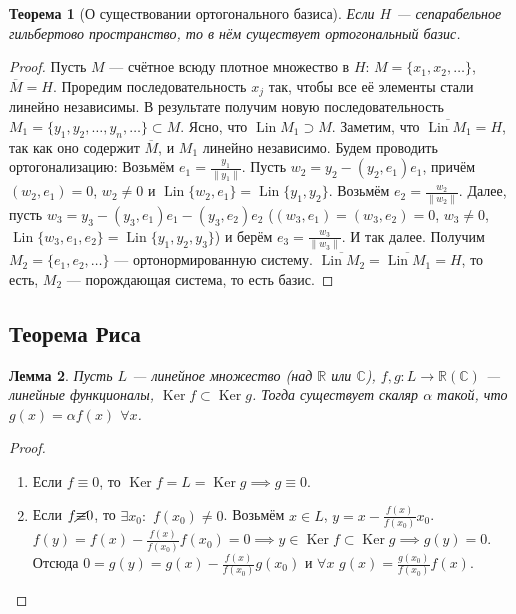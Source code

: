 \documentclass[11pt,openany,a4paper]{scrartcl}
\theoremstyle{plain}
\newtheorem{theorem}{Теорема}[subsection]
\newtheorem{lemma}[theorem]{Лемма}
\theoremstyle{definition}
\newcommand\mb{\mathbb}
\newcommand\real{\mb R}
\newcommand{\complex}{\mb C}
\newcommand\ol{\overline}
\DeclareMathOperator{\Ker}{Ker}
\DeclareMathOperator{\Lin}{Lin}
\begin{document}
\begin{theorem}[О существовании ортогонального базиса]
    Если $H$ — сепарабельное гильбертово пространство, то в нём существует
    ортогональный базис.
\end{theorem}
\begin{proof}
    Пусть $M$ — счётное всюду плотное множество в $H$:
    $M = \{x_1, x_2, \ldots\}$, $\ol M = H$. Проредим последовательность $x_j$
    так, чтобы все её элементы стали линейно независимы. В результате получим
    новую последовательность $M_1 = \{y_1, y_2,\ldots,y_n,\ldots\} \subset M$.
    Ясно, что $\Lin M_1 \supset M$. Заметим, что $\ol{\Lin M_1} = H$, так как оно
    содержит $\ol M$, и $M_1$ линейно независимо. Будем проводить ортогонализацию:
    Возьмём $e_1 = \frac{y_1}{\|y_1\|}$. Пусть $w_2 = y_2 - (y_2, e_1)e_1$, причём
    $(w_2, e_1) = 0$, $w_2 \neq 0$ и $\Lin\{w_2, e_1\} = \Lin \{y_1, y_2\}$.
    Возьмём $e_2 = \frac{w_2}{\|w_2\|}$. Далее, пусть $w_3 = y_3 - (y_3, e_1)e_1 -
    (y_3, e_2)e_2$ ($(w_3, e_1) = (w_3, e_2) = 0$, $w_3 \neq 0$,
    $\Lin\{w_3, e_1, e_2\} = \Lin\{y_1, y_2, y_3\}$) и берём
    $e_3 = \frac{w_3}{\|w_3\|}$. И так далее. Получим
    $M_2 = \{e_1, e_2, \ldots\}$ — ортонормированную систему.
    $\ol{\Lin M_2} = \ol{\Lin M_1} = H$, то есть, $M_2$ — порождающая система,
    то есть базис.
\end{proof}

\subsection{Теорема Риса}

\begin{lemma}
    Пусть $L$ — линейное множество (над $\real$ или $\complex$),
    $f, g: L \to \real(\complex)$ — линейные функционалы, $\Ker f \subset \Ker g$.
    Тогда существует скаляр $\alpha$ такой, что $g(x) = \alpha f(x)$ $\forall x$.
\end{lemma}
\begin{proof}
\mbox{}
    \begin{enumerate}
        \item Если $f\equiv 0$, то $\Ker f = L = \Ker g \implies g \equiv 0$.
        \item Если $f\cancel \equiv 0$, то $\exists x_0:$ $f(x_0) \neq 0$.
        Возьмём $x\in L$, $y = x - \frac{f(x)}{f(x_0)}x_0$.
        $f(y) = f(x) - \frac{f(x)}{f(x_0)}f(x_0) = 0 \implies
        y \in \Ker f\subset \Ker g \implies g(y) = 0$. Отсюда
        $0 = g(y) = g(x) - \frac{f(x)}{f(x_0)}g(x_0)$ и $\forall x$
        $g(x) = \frac{g(x_0)}{f(x_0)}f(x)$.
    \end{enumerate}
\end{proof}
\end{document}
